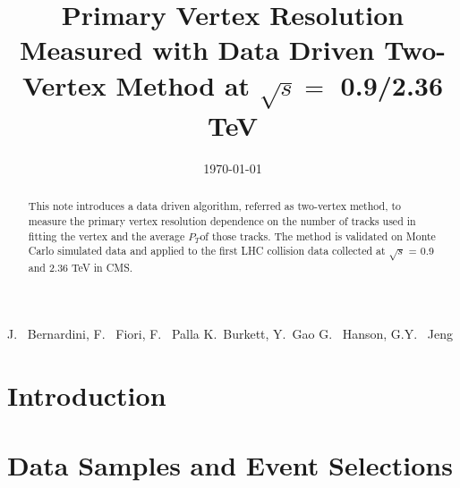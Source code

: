 \documentclass{cmspaper}
\newcommand{\pt} {\ensuremath{P_T}}
\begin{document}
%
\begin{titlepage}
\date{\today}

\title{Primary Vertex Resolution Measured with Data Driven Two-Vertex Method at $\sqrt{s} = $ 0.9/2.36 TeV}

  \begin{Authlist}
    J.~ Bernardini, F.~ Fiori, F.~ Palla
    K.~Burkett, Y.~Gao
    G.~ Hanson, G.Y.~ Jeng

  \end{Authlist}

\begin{abstract}

This note introduces a data driven algorithm, referred as two-vertex method, to 
measure the primary vertex resolution dependence on the number of tracks used 
in fitting the vertex and the average \pt of those tracks. 
The method is validated on Monte Carlo simulated data and applied to 
the first LHC collision data collected at $\sqrt{s}$ = 0.9 and 2.36 TeV in CMS.

\end{abstract}
\end{titlepage}

\setcounter{page}{2}%
\tableofcontents
\pagebreak


\section {Introduction}
\label{sec:intro}


\section{Data Samples and Event Selections}
\label{sec:datasample}


\end{document}
